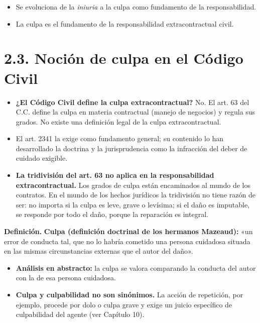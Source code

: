\begin{itemize}
\item Se evoluciona de la \textit{iniuria} a la culpa como fundamento de la responsabilidad.
\item La culpa es el fundamento de la responsabilidad extracontractual civil.
\end{itemize}
\section{2.3. Noción de culpa en el Código Civil}
\begin{itemize}
\item \textbf{¿El Código Civil define la culpa extracontractual?} No. El art. 63 del C.C. define la culpa en materia contractual (manejo de negocios) y regula sus grados. No existe una definición legal de la culpa extracontractual.
\item El art. 2341 la exige como fundamento general; su contenido lo han desarrollado la doctrina y la jurisprudencia como la infracción del deber de cuidado exigible.
\item \textbf{La tridivisión del art. 63 no aplica en la responsabilidad extracontractual.} Los grados de culpa están encaminados al mundo de los contratos. En el mundo de los hechos jurídicos la tridivisión no tiene razón de ser: no importa si la culpa es leve, grave o levísima; si el daño es imputable, se responde por todo el daño, porque la reparación es integral.
\end{itemize}
\begin{definicion}
\textcolor[HTML]{1F3864}{\textbf{Definición. }}\textbf{Culpa (definición doctrinal de los hermanos Mazeaud): }«un error de conducta tal, que no lo habría cometido una persona cuidadosa situada en las mismas circunstancias externas que el autor del daño».
\end{definicion}
\begin{itemize}
\item \textbf{Análisis en abstracto:} la culpa se valora comparando la conducta del autor con la de esa persona cuidadosa.
\item \textbf{Culpa y culpabilidad no son sinónimos.} La acción de repetición, por ejemplo, procede por dolo o culpa grave y exige un juicio específico de culpabilidad del agente (ver Capítulo 10).
\end{itemize}
